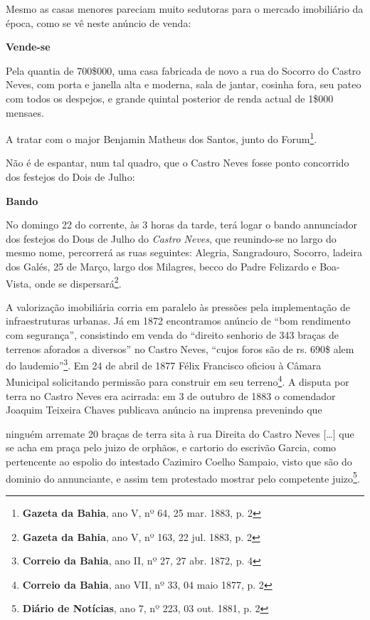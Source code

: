 Mesmo as casas menores pareciam muito sedutoras para o mercado imobiliário da época, como se vê neste anúncio de venda:

\begin{citacao}
\textbf{Vende-se}

Pela quantia de 700\$000, uma casa fabricada de novo a rua do Socorro do Castro Neves, com porta e janella alta e moderna, sala de jantar, cosinha fora, seu pateo com todos os despejos, e grande quintal posterior de renda actual de 1\$000 mensaes.

A tratar com o major Benjamin Matheus dos Santos, junto do Forum\footnote{\textbf{Gazeta da Bahia}, ano V, nº 64, 25 mar. 1883, p. 2}.
\end{citacao}

Não é de espantar, num tal quadro, que o Castro Neves fosse ponto concorrido dos festejos do Dois de Julho:

\begin{citacao}
\textbf{Bando}

No domingo 22 do corrente, às 3 horas da tarde, terá logar o bando annunciador dos festejos do Dous de Julho do \textit{Castro Neves}, que reunindo-se no largo do mesmo nome, percorrerá as ruas seguintes: Alegria, Sangradouro, Socorro, ladeira dos Galés, 25 de Março, largo dos Milagres, becco do Padre Felizardo e Boa-Vista, onde se dispersará\footnote{\textbf{Gazeta da Bahia}, ano V, nº 163, 22 jul. 1883, p. 2}.
\end{citacao}

A valorização imobiliária corria em paralelo às pressões pela implementação de infraestruturas urbanas. Já em 1872 encontramos anúncio de ``bom rendimento com segurança'', consistindo em venda do ``direito senhorio de 343 braças de terrenos aforados a diversos'' no Castro Neves, ``cujos foros são de rs. 690\$ alem do laudemio''\footnote{\textbf{Correio da Bahia}, ano II, nº 27, 27 abr. 1872, p. 4}. Em 24 de abril de 1877 Félix Francisco oficiou à Câmara Municipal solicitando permissão para construir em seu terreno\footnote{\textbf{Correio da Bahia}, ano VII, nº 33, 04 maio 1877, p. 2}. A disputa por terra no Castro Neves era acirrada: em 3 de outubro de 1883 o comendador Joaquim Teixeira Chaves publicava anúncio na imprensa prevenindo que 
 
\begin{citacao}
ninguém arremate 20 braças de terra sita à rua Direita do Castro Neves [\dots] que se acha em praça pelo juizo de orphãos, e cartorio do escrivão Garcia, como pertencente ao espolio do intestado Cazimiro Coelho Sampaio, visto que são do dominio do annunciante, e assim tem protestado mostrar pelo competente juizo\footnote{\textbf{Diário de Notícias}, ano 7, nº 223, 03 out. 1881, p. 2}.
\end{citacao}

